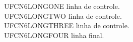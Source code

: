 UFCN6LONGONE linha de controle.\\
UFCN6LONGTWO linha de controle.\\
UFCN6LONGTHREE linha de controle.\\
UFCN6LONGFOUR linha final.
